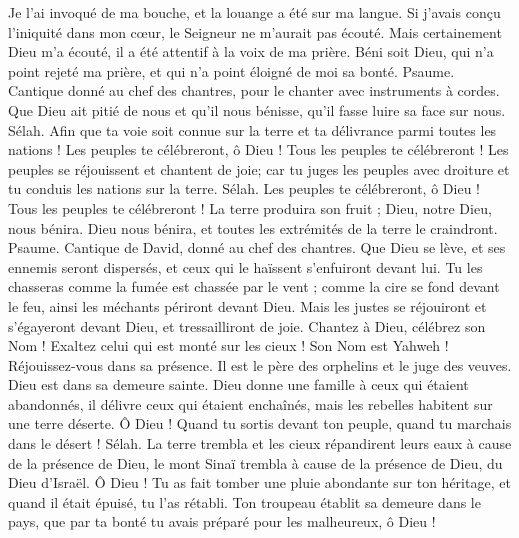 \begin{multicols}{2}
Je l'ai invoqué de ma bouche, et la louange a été sur ma langue.
Si j'avais conçu l'iniquité dans mon cœur, le Seigneur ne m'aurait pas écouté.
Mais certainement Dieu m'a écouté, il a été attentif à la voix de ma prière.
Béni soit Dieu, qui n'a point rejeté ma prière, et qui n'a point éloigné de moi sa bonté.
\VerseOne{}Psaume. Cantique donné au chef des chantres, pour le chanter avec instruments à cordes.
Que Dieu ait pitié de nous et qu'il nous bénisse, qu'il fasse luire sa face sur nous. Sélah.
Afin que ta voie soit connue sur la terre et ta délivrance parmi toutes les nations !
Les peuples te célébreront, ô Dieu ! Tous les peuples te célébreront !
Les peuples se réjouissent et chantent de joie; car tu juges les peuples avec droiture et tu conduis les nations sur la terre. Sélah.
Les peuples te célébreront, ô Dieu ! Tous les peuples te célébreront !
La terre produira son fruit ; Dieu, notre Dieu, nous bénira.
Dieu nous bénira, et toutes les extrémités de la terre le craindront.
\VerseOne{}Psaume. Cantique de David, donné au chef des chantres.
Que Dieu se lève, et ses ennemis seront dispersés, et ceux qui le haïssent s'enfuiront devant lui.
Tu les chasseras comme la fumée est chassée par le vent ; comme la cire se fond devant le feu, ainsi les méchants périront devant Dieu.
Mais les justes se réjouiront et s'égayeront devant Dieu, et tressailliront de joie.
Chantez à Dieu, célébrez son Nom ! Exaltez celui qui est monté sur les cieux ! Son Nom est Yahweh ! Réjouissez-vous dans sa présence.
Il est le père des orphelins et le juge des veuves. Dieu est dans sa demeure sainte.
Dieu donne une famille à ceux qui étaient abandonnés, il délivre ceux qui étaient enchaînés, mais les rebelles habitent sur une terre déserte.
Ô Dieu ! Quand tu sortis devant ton peuple, quand tu marchais dans le désert ! Sélah.
La terre trembla et les cieux répandirent leurs eaux à cause de la présence de Dieu, le mont Sinaï trembla à cause de la présence de Dieu, du Dieu d'Israël.
Ô Dieu ! Tu as fait tomber une pluie abondante sur ton héritage, et quand il était épuisé, tu l'as rétabli.
Ton troupeau établit sa demeure dans le pays, que par ta bonté tu avais préparé pour les malheureux, ô Dieu !

\end{multicols}
